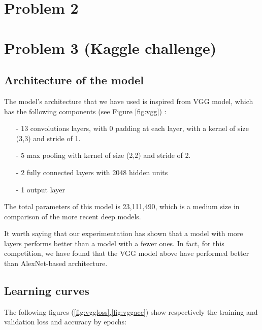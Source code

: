 \documentclass[a4paper]{article}
\begin{document}
\section{Problem 2}
\label{sec:problem1}

\section{Problem 3 (Kaggle challenge)}
\label{sec:problem1}

\subsection{Architecture of the model}
The model's architecture that we have used is inspired from VGG model, which has the following components (see Figure \ref{fig:vgg}) :

\begin{itemize}
	\item[-] 13 convolutions layers, with 0 padding at each layer, with a kernel of size (3,3) and stride of 1.
	\item[-] 5 max pooling with kernel of size (2,2) and stride of 2.
	\item[-] 2 fully connected layers with 2048 hidden units
	\item[-] 1 output layer
\end{itemize}


The total parameters of this model is 23,111,490, which is a medium size in comparison of the more recent deep models.

It worth saying that our experimentation has shown that a model with more layers performs better than a model with a fewer ones. In fact, for this competition, we have found that the VGG model above have performed better than AlexNet-based architecture.

\subsection{Learning curves}
The following figures (\ref{fig:vggloss},\ref{fig:vggacc}) show respectively the training and validation loss and accuracy by epochs:
\end{document}
